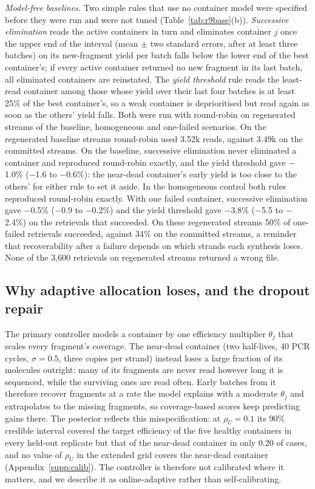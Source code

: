 \documentclass[acmsmall,screen]{acmart}
\begin{document}
\emph{Model-free baselines.}\label{sec:res-extra}  Two simple rules that use no container model were
specified before they were run and were not tuned (Table~\ref{tab:r9base}(b)).  \emph{Successive
elimination} reads the active containers in turn and eliminates container $j$ once the upper end of the
interval (mean $\pm$ two standard errors, after at least three batches) on its new-fragment yield per
batch falls below the lower end of the best container's; if every active container returned no new
fragment in its last batch, all eliminated containers are reinstated.  The \emph{yield threshold} rule
reads the least-read container among those whose yield over their last four batches is at least 25\% of
the best container's, so a weak container is deprioritised but read again as soon as the others' yield
falls.  Both were run with round-robin on regenerated streams of the baseline, homogeneous and
one-failed scenarios.  On the regenerated baseline streams round-robin used 3.52k reads, against 3.49k on the committed streams.  On the baseline, successive elimination never eliminated a container and reproduced round-robin exactly, and the yield threshold gave $-$1.0\% ($-$1.6 to $-$0.6\%): the near-dead container's early yield is too close to the others' for either rule to set it aside.  In the homogeneous control both rules reproduced round-robin exactly.  With one failed container, successive elimination gave $-$0.5\% ($-$0.9 to $-$0.2\%) and the yield threshold gave $-$3.8\% ($-$5.5 to $-$2.4\%) on the retrievals that succeeded.  On these regenerated streams 50\% of one-failed retrievals succeeded, against 34\% on the committed streams, a reminder that recoverability after a failure depends on which strands each synthesis loses.  None of the 3{,}600 retrievals on regenerated streams returned a wrong file.

\subsection{Why adaptive allocation loses, and the dropout repair}\label{sec:res-misspec}\label{sec:res-dropout}\label{sec:res-calib}
The primary controller models a container by one efficiency multiplier $\theta_j$ that scales every
fragment's coverage.  The near-dead container (two half-lives, 40 PCR cycles, $\sigma{=}0.5$, three
copies per strand) instead loses a large fraction of its molecules outright: many of its fragments are
never read however long it is sequenced, while the surviving ones are read often.  Early batches from it
therefore recover fragments at a rate the model explains with a moderate $\theta_j$ and extrapolates to
the missing fragments, so coverage-based scores keep predicting gains there.  The posterior reflects
this misspecification: at $\rho_U{=}0.1$ its 90\% credible interval covered the target efficiency of the
five healthy containers in every held-out replicate but that of the near-dead container in only 0.20 of
cases, and no value of $\rho_U$ in the extended grid covers the near-dead container
(Appendix~\ref{supp:calib}).  The controller is therefore not calibrated where it matters,
and we describe it as online-adaptive rather than self-calibrating.
\end{document}
